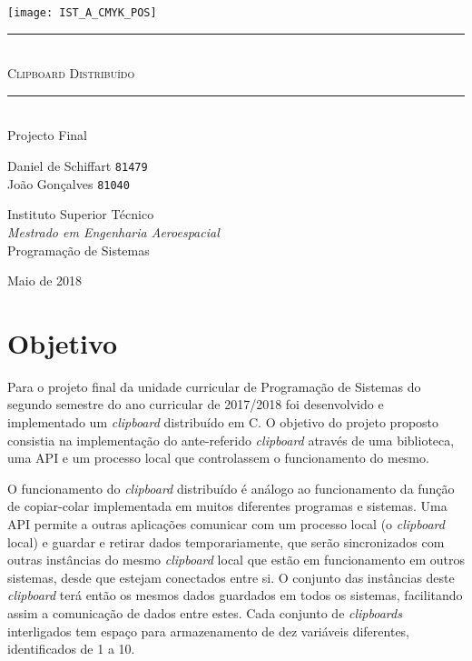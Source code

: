 \documentclass{article}
\begin{document}
\begin{titlepage}
	\texttt{[image: IST\_A\_CMYK\_POS]}
	
	\begin{center}
		\vspace{70mm} %
		\rule{\linewidth}{0.5pt} \\
		\Huge \textsc{Clipboard Distribuído} \\
		\rule{\linewidth}{2pt} \\
		\vspace{10mm} %
		\LARGE Projecto Final
		
		\vspace{\fill} %
		\large
		Daniel de Schiffart \texttt{81479} \\
		João Gonçalves \texttt{81040}
		
		\vspace{10mm} %
        \Large Instituto Superior Técnico \\
        \textit{Mestrado em Engenharia Aeroespacial} \\
        \vspace{1mm}
        \large Programação de Sistemas
		
		\vspace{10mm} %
		\Large Maio de 2018
	\end{center}
\end{titlepage}

\section{Objetivo}

Para o projeto final da unidade curricular de Programação de Sistemas do
segundo semestre do ano curricular de 2017/2018 foi desenvolvido e
implementado um \textit{clipboard} distribuído em C. O objetivo do
projeto proposto consistia na implementação do ante-referido 
\textit{clipboard} através de uma biblioteca, uma API e um processo
local que controlassem o funcionamento do mesmo.

O funcionamento do \textit{clipboard} distribuído é análogo ao
funcionamento da função de copiar-colar implementada em muitos diferentes
programas e sistemas. Uma API permite a outras aplicações comunicar com
um processo local (o \textit{clipboard} local) e guardar e retirar dados
temporariamente, que serão sincronizados com outras instâncias do mesmo
\textit{clipboard} local que estão em funcionamento em outros sistemas,
desde que estejam conectados entre si. O conjunto das instâncias deste
\textit{clipboard} terá então os mesmos dados guardados em todos os
sistemas, facilitando assim a comunicação de dados entre estes.
Cada conjunto de \textit{clipboards} interligados tem espaço para
armazenamento de dez variáveis diferentes, identificados de 1 a 10.
\end{document}
